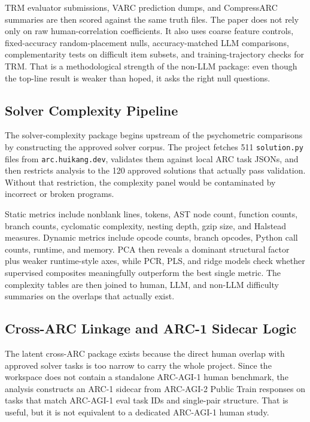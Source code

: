 \documentclass[11pt,letterpaper]{article}
\begin{document}
TRM evaluator submissions, VARC prediction dumps, and CompressARC summaries are then scored against the same truth files. The paper does not rely only on raw human-correlation coefficients. It also uses coarse feature controls, fixed-accuracy random-placement nulls, accuracy-matched LLM comparisons, complementarity tests on difficult item subsets, and training-trajectory checks for TRM. That is a methodological strength of the non-LLM package: even though the top-line result is weaker than hoped, it asks the right null questions.

\subsection{Solver Complexity Pipeline}

The solver-complexity package begins upstream of the psychometric comparisons by constructing the approved solver corpus. The project fetches 511 \texttt{solution.py} files from \texttt{arc.huikang.dev}, validates them against local ARC task JSONs, and then restricts analysis to the 120 approved solutions that actually pass validation. Without that restriction, the complexity panel would be contaminated by incorrect or broken programs.

Static metrics include nonblank lines, tokens, AST node count, function counts, branch counts, cyclomatic complexity, nesting depth, gzip size, and Halstead measures. Dynamic metrics include opcode counts, branch opcodes, Python call counts, runtime, and memory. PCA then reveals a dominant structural factor plus weaker runtime-style axes, while PCR, PLS, and ridge models check whether supervised composites meaningfully outperform the best single metric. The complexity tables are then joined to human, LLM, and non-LLM difficulty summaries on the overlaps that actually exist.

\subsection{Cross-ARC Linkage and ARC-1 Sidecar Logic}

The latent cross-ARC package exists because the direct human overlap with approved solver tasks is too narrow to carry the whole project. Since the workspace does not contain a standalone ARC-AGI-1 human benchmark, the analysis constructs an ARC-1 sidecar from ARC-AGI-2 Public Train responses on tasks that match ARC-AGI-1 eval task IDs and single-pair structure. That is useful, but it is not equivalent to a dedicated ARC-AGI-1 human study.
\end{document}
